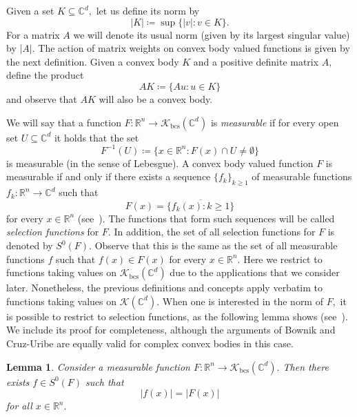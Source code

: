 \documentclass{article}
\newtheorem{lemma}[theorem]{Lemma}
\theoremstyle{definition}
\theoremstyle{remark}
\numberwithin{equation}{section}
\newcommand{\cK}{\mathcal{K}}
\newcommand{\reals}{\mathbb{R}}
\newcommand{\complex}{\mathbb{C}}
\newcommand{\convex}{\cK_{\mathrm{bcs}}}
\newcommand{\1}{\mathbf{1}}
\begin{document}
    Given a set $K \subseteq \complex^d,$ let us define its norm by
    \begin{equation*}
        |K| \coloneq \sup \{|v|\colon v \in K\}.
    \end{equation*}
    For a matrix $A$ we will denote its usual norm (given by its largest singular value) by $|A|.$
    The action of matrix weights on convex body valued functions is given by the next definition.
    Given a convex body $K$ and a positive definite matrix $A,$ define the product
    \begin{equation*}
        A K \coloneq \{A u\colon u \in K\}
    \end{equation*}
    and observe that $AK$ will also be a convex body.

    We will say that a function $F\colon \reals^n \rightarrow \convex(\complex^d)$ is \emph{measurable}
    if for every open set $U \subseteq \complex^d$ it holds that the set
    \begin{equation*}
        F^{-1}(U) \coloneq \{x\in\reals^n\colon F(x) \cap U \neq \emptyset\}
    \end{equation*}
    is measurable (in the sense of Lebesgue).
    A convex body valued function $F$ is measurable if and only if there exists a sequence $\{f_k\}_{k \geq 1}$
    of measurable functions $f_k\colon \reals^n \rightarrow \complex^d$ such that
    \begin{equation}
        \label{eq:SelectionFunctionMeasurability}
        F(x) = \overline{\{f_k(x)\colon k \geq 1\}}
    \end{equation}
    for every $x \in \reals^n$ (see~\cite[Theorem~8.1.4]{Aubin_2009}).
    The functions that form such sequences will be called \emph{selection functions} for $F.$
    In addition, the set of all selection functions for $F$ is denoted by $S^0(F).$
    Observe that this is the same as the set of all measurable functions $f$ such that $f(x) \in F(x)$
    for every $x \in \reals^n.$
    Here we restrict to functions taking values on $\convex(\complex^d)$ due to the applications that we consider later.
    Nonetheless, the previous definitions and concepts apply verbatim to functions taking values on $\cK(\complex^d).$
    When one is interested in the norm of $F,$ it is possible to restrict to selection functions, as the following lemma shows
    (see~\cite[Lemma~3.9]{Cruz_Uribe_Bownik_Extrapolation}).
    We include its proof for completeness, although the arguments of Bownik and Cruz-Uribe
    are equally valid for complex convex bodies in this case.
    \begin{lemma}
        \label{lemma:ModulusSelectionFunction}
        Consider a measurable function $F\colon \reals^n \rightarrow \convex(\complex^d).$
        Then there exists $f \in S^0(F)$ such that
        \begin{equation*}
            |f(x)| = |F(x)|
        \end{equation*}
        for all $x \in \reals^n.$
    \end{lemma}
\end{document}
